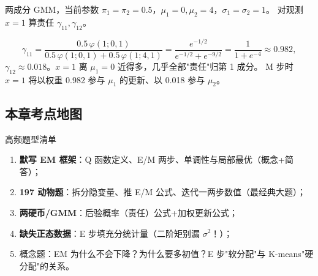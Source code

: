 \begin{exbox}
两成分 GMM，当前参数 $\pi_1=\pi_2=0.5$，$\mu_1=0,\mu_2=4$，$\sigma_1=\sigma_2=1$。
对观测 $x=1$ 算责任 $\gamma_{11},\gamma_{12}$。
\end{exbox}
\begin{sol}
\[
\gamma_{11}=\frac{0.5\,\varphi(1;0,1)}{0.5\,\varphi(1;0,1)+0.5\,\varphi(1;4,1)}
=\frac{e^{-1/2}}{e^{-1/2}+e^{-9/2}}
=\frac{1}{1+e^{-4}}\approx0.982 ,
\]
$\gamma_{12}\approx0.018$。$x=1$ 离 $\mu_1=0$ 近得多，几乎全部"责任"归第 1 成分。
M 步时 $x=1$ 将以权重 0.982 参与 $\mu_1$ 的更新、以 0.018 参与 $\mu_2$。
\end{sol}

\subsection{本章考点地图}

\begin{ebox}{高频题型清单}
\begin{enumerate}[leftmargin=2em]
  \item \textbf{默写 EM 框架}：Q 函数定义、E/M 两步、单调性与局部最优（概念+简答）；
  \item \textbf{197 动物题}：拆分隐变量、推 E/M 公式、迭代一两步数值（最经典大题）；
  \item \textbf{两硬币/GMM}：后验概率（责任）公式+加权更新公式；
  \item \textbf{缺失正态数据}：E 步填充分统计量（二阶矩别漏 $\sigma^2$！）；
  \item 概念题：EM 为什么不会下降？为什么要多初值？E 步"软分配"与 K-means"硬分配"的关系。
\end{enumerate}
\end{ebox}
